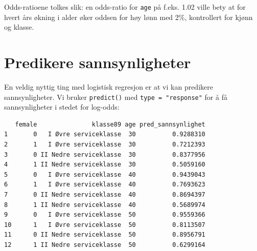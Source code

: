 \documentclass[
  norsk,
  letterpaper,
  DIV=11,
  numbers=noendperiod]{scrreprt}
\newenvironment{Shaded}{\begin{snugshade}}{\end{snugshade}}
\newcommand{\AttributeTok}[1]{\textcolor[rgb]{0.40,0.45,0.13}{#1}}
\newcommand{\DecValTok}[1]{\textcolor[rgb]{0.68,0.00,0.00}{#1}}
\newcommand{\FunctionTok}[1]{\textcolor[rgb]{0.28,0.35,0.67}{#1}}
\newcommand{\NormalTok}[1]{\textcolor[rgb]{0.00,0.23,0.31}{#1}}
\newcommand{\OtherTok}[1]{\textcolor[rgb]{0.00,0.23,0.31}{#1}}
\newcommand{\SpecialCharTok}[1]{\textcolor[rgb]{0.37,0.37,0.37}{#1}}
\newcommand{\StringTok}[1]{\textcolor[rgb]{0.13,0.47,0.30}{#1}}
\theoremstyle{definition}
\theoremstyle{remark}
\begin{document}
Odds-ratioene tolkes slik: en odds-ratio for \texttt{age} på f.eks. 1.02
ville bety at for hvert års økning i alder øker oddsen for høy lønn med
2\%, kontrollert for kjønn og klasse.

\section{Predikere sannsynligheter}\label{predikere-sannsynligheter}

En veldig nyttig ting med logistisk regresjon er at vi kan predikere
sannsynligheter. Vi bruker \texttt{predict()} med
\texttt{type\ =\ "response"} for å få sannsynligheter i stedet for
log-odds:

\begin{Shaded}
\end{Shaded}

\begin{verbatim}
   female               klasse89 age pred_sannsynlighet
1       0   I Øvre serviceklasse  30          0.9288310
2       1   I Øvre serviceklasse  30          0.7212393
3       0 II Nedre serviceklasse  30          0.8377956
4       1 II Nedre serviceklasse  30          0.5059160
5       0   I Øvre serviceklasse  40          0.9439043
6       1   I Øvre serviceklasse  40          0.7693623
7       0 II Nedre serviceklasse  40          0.8694397
8       1 II Nedre serviceklasse  40          0.5689974
9       0   I Øvre serviceklasse  50          0.9559366
10      1   I Øvre serviceklasse  50          0.8113507
11      0 II Nedre serviceklasse  50          0.8956791
12      1 II Nedre serviceklasse  50          0.6299164
\end{verbatim}
\end{document}
